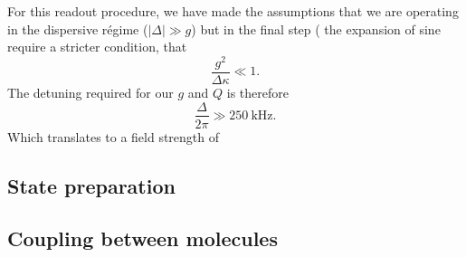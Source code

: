 For this readout procedure, we have made the assumptions that we are operating
in the dispersive r\'egime ($|\Delta| \gg g$) but in the final step
( the expansion of sine require a stricter condition,
that 
%
\begin{equation}
  \frac{g^2}{\Delta\kappa} \ll 1.
\end{equation}
%
The detuning required for our $g$ and $Q$ is therefore
%
\begin{equation}
  \frac{\Delta}{2 \pi} \gg \SI{250}{\kilo\hertz}.
\end{equation}
%
Which translates to a field strength of 

\subsection{State preparation}



\subsection{Coupling between molecules}



